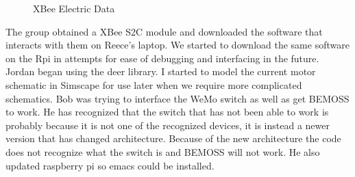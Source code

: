 \documentclass[fontsize=11pt, %
                             paper=letter, %
                             twoside, %
                             captions=tableheading,
                             index=totoc,
                             hyperref]{labbook}
\begin{document}
\begin{figure}
  \centering
  \caption{XBee Electric Data}
  \label{fig:XBeeElectricData}
\end{figure}

The group obtained a XBee S2C module and downloaded the software that interacts with them on Reece's laptop. We started to download the same software on the Rpi in attempts for ease of debugging and interfacing in the future. 
Jordan began using the deer library. I started to model the current motor schematic in Simscape for use later when we require more complicated schematics. 
Bob was trying to interface the WeMo switch as well as get BEMOSS to work. He has recognized that the switch that has not been able to work is probably because it is not one of the recognized devices, it is instead a newer version that has changed architecture. Because of the new architecture the code does not recognize what the switch is and BEMOSS will not work. He also updated raspberry pi so emacs could be installed.
\end{document}
